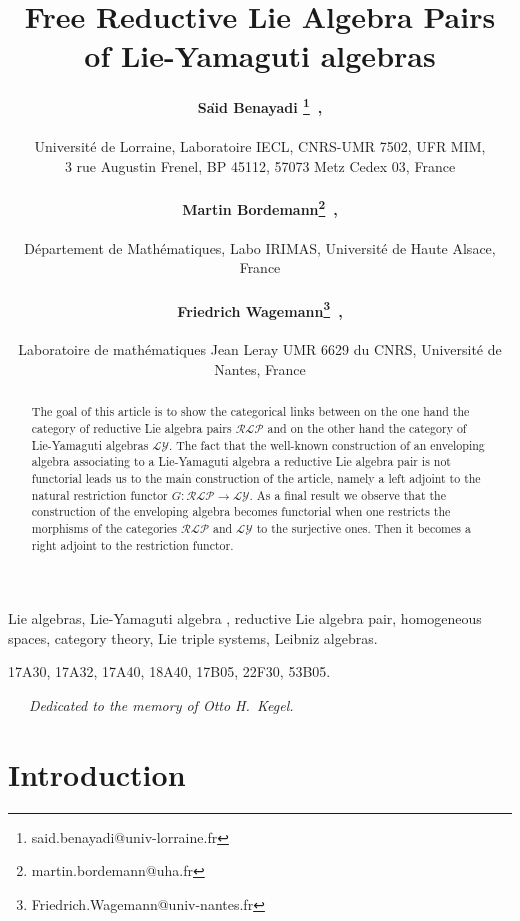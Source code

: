 \documentclass [11pt] {article}
\title {Free Reductive Lie Algebra Pairs of Lie-Yamaguti algebras}
\author {
	{\bf Sa\"{\i}d Benayadi
		\thanks{said.benayadi@univ-lorraine.fr}~,
		\addtocounter{footnote}{1}}\\[3mm]
Universit\'{e} de Lorraine, Laboratoire IECL, 
	CNRS-UMR 7502, UFR MIM,\\ 3 rue Augustin Frenel,
	 BP 45112, 57073 Metz Cedex 03, France \\[3mm]
	     {\bf
          Martin
          Bordemann\thanks{martin.bordemann@uha.fr}~,
          \addtocounter{footnote}{2}} \\[3mm]
         D\'{e}partement de Math\'{e}matiques, Labo IRIMAS, 
         Universit\'{e} de Haute Alsace, France\\[3mm]
         {\bf Friedrich Wagemann\thanks{Friedrich.Wagemann@univ-nantes.fr}~,
         \addtocounter{footnote}{3}}\\[3mm]
         Laboratoire de math\'{e}matiques Jean Leray
         UMR 6629 du CNRS,
         Universit\'{e} de Nantes, France  
}
\theoremstyle{definition}
\begin{document}
\maketitle
\thispagestyle{empty}

\begin{abstract}
The goal of this article is to show the categorical links between on the one
hand the category of reductive Lie algebra pairs $\mathcal{RLP}$ and on the
other hand the category of Lie-Yamaguti algebras $\mathcal{LY}$. The fact that
the well-known construction of an enveloping algebra associating to a
Lie-Yamaguti algebra a reductive Lie algebra pair is not functorial leads us
to the main construction of the
article, namely a left adjoint to the natural restriction functor
$G:\mathcal{RLP}\to\mathcal{LY}$. As a final result we observe that the
construction of the enveloping algebra becomes functorial when one restricts
the morphisms of the categories $\mathcal{RLP}$ and $\mathcal{LY}$ to the
surjective ones. Then it becomes a right adjoint to the restriction functor.
\end{abstract}

 Lie algebras, Lie-Yamaguti algebra ,  reductive Lie algebra pair,  homogeneous spaces, category theory, Lie triple systems, Leibniz algebras.

   17A30, 17A32, 17A40, 18A40, 17B05, 22F30, 53B05.





\newpage


%
%
~~~\hfill \textit{Dedicated to the memory of Otto H.~Kegel.}
\section*{Introduction}
 
\end{document}
